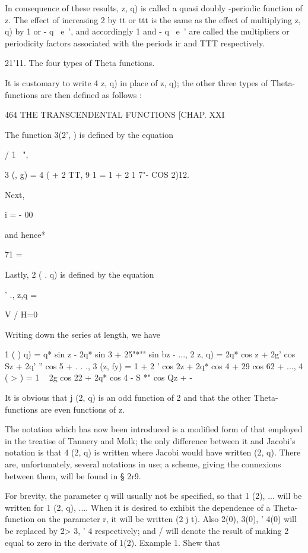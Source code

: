 In consequence of these results, z, q) is called a quasi doubly
-periodic function of z. The effect of increasing 2 by tt or ttt is
the same as the effect of multiplying z, q) by 1 or - q~ e~', and
accordingly 1 and - q~ e~' are called the multipliers or periodicity
factors associated with the periods ir and TTT respectively.

21'11. The four types of Theta functions.

It is customary to write 4 z, q) in place of z, q); the other three
types of Theta-functions are then defined as follows :

464 THE TRANSCENDENTAL FUNCTIONS [CHAP. XXI

The function 3(2', ) is defined by the equation

/ 1 \ ",

 3 (, g) = 4 ( + 2 TT, 9 1 = 1 + 2 1 7"- COS 2)12.

Next, %

 i = - 00

and hence* %

71 =

Lastly, 2 ( . q) is defined by the equation

' ., z,q = %

V / H=0

Writing down the series at length, we have

 1 ( ) q) = q* sin z - 2q* sin 3 + 25"*"" sin bz - ..., 2 z, q) = 2q*
cos z + 2g' cos Sz + 2q' '' cos 5 + . . ., 3 (z, fy) = 1 + 2 ' cos 2z
+ 2q* cos 4 + 29 cos 62 + ..., 4 ( > ) = 1 ~ 2g cos 22 + 2q* cos 4 -
S *" cos Qz + -

It is obvious that j (2, q) is an odd function of 2 and that the other
Theta-functions are even functions of z.

The notation which has now been introduced is a modified form of that
employed in the treatise of Tannery and Molk; the only difference
between it and Jacobi's notation is that 4 (2, q) is written where
Jacobi would have written (2, q). There are, unfortunately, several
notations in use; a scheme, giving the connexions between them, will
be found in § 2r9.

For brevity, the parameter q will usually not be specified, so that 1
(2), ... will be written for 1 (2, q), .... When it is desired to
exhibit the dependence of a Theta-function on the parameter r, it will
be written (2 j t). Also 2(0), 3(0), ' 4(0) will be replaced by 2> 3,
' 4 respectively; and / will denote the result of making 2 equal to
zero in the derivate of 1(2). Example 1. Shew that

